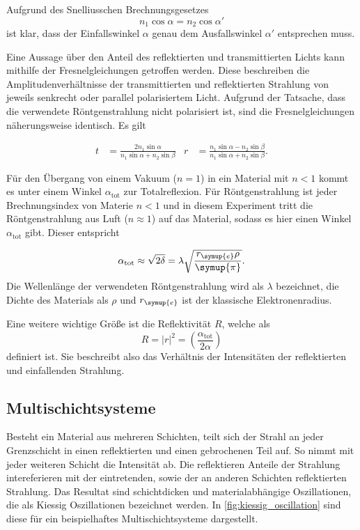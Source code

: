 Aufgrund des Snelliusschen Brechnungsgesetzes
\begin{equation*}
    n_1 \cos \alpha = n_2 \cos \alpha'
\end{equation*}
ist klar, dass der Einfallswinkel $\alpha$ genau dem Ausfallswinkel $\alpha'$ entsprechen muss.

Eine Aussage über den Anteil des reflektierten und transmittierten Lichts kann mithilfe der Fresnelgleichungen getroffen werden. Diese beschreiben die Amplitudenverhältnisse der 
transmittierten und reflektierten Strahlung von jeweils senkrecht oder parallel polarisiertem Licht. Aufgrund der Tatsache, dass die verwendete Röntgenstrahlung nicht polarisiert ist,
sind die Fresnelgleichungen näherungsweise identisch. Es gilt

\begin{align*}
    t &= \frac{2n_1\sin\alpha}{n_1\sin\alpha + n_2 \sin\beta} & r &= \frac{n_1\sin\alpha - n_2\sin\beta}{n_1\sin\alpha+n_2 \sin\beta}.
\end{align*}

Für den Übergang von einem Vakuum ($n=1$) in ein Material mit $n<1$ kommt es unter einem Winkel $\alpha_{\text{tot}}$ zur Totalreflexion. Für Röntgenstrahlung ist jeder Brechnungsindex 
von Materie $n<1$ und in diesem Experiment tritt die Röntgenstrahlung aus Luft ($n \approx 1$) auf das Material, sodass es hier einen Winkel $\alpha_{\text{tot}}$ gibt. Dieser entspricht

\begin{equation}
    \alpha_{\text{tot}} \approx \sqrt{2\delta} = \lambda \sqrt{\frac{r_{\symup{e}}\rho}{\symup{\pi}}}.
    \label{eq:alpha_tot}
\end{equation}
Die Wellenlänge der verwendeten Röntgenstrahlung wird als $\lambda$ bezeichnet, die Dichte des Materials als $\rho$ und $r_{\symup{e}}$ ist der klassische Elektronenradius.

Eine weitere wichtige Größe ist die Reflektivität $R$, welche als
\begin{equation}
    R = |{r}|^2 = \left(\frac{\alpha_{\text{tot}}}{2\alpha}\right)
    \label{eq:Reflektivitaet}
\end{equation}
definiert ist. Sie beschreibt also das Verhältnis der Intensitäten der reflektierten und einfallenden Strahlung.%

\subsection{Multischichtsysteme}
Besteht ein Material aus mehreren Schichten, teilt sich der Strahl an jeder Grenzschicht in einen reflektierten und einen gebrochenen Teil auf. So nimmt mit jeder weiteren Schicht
die Intensität ab. Die reflektieren Anteile der Strahlung intereferieren mit der eintretenden, sowie der an anderen Schichten reflektierten Strahlung. Das Resultat sind schichtdicken
und materialabhängige Oszillationen, die als Kiessig Oszillationen bezeichnet werden. In \autoref{fig:kiessig_oscillation} sind diese für ein beispielhaftes Multischichtsysteme dargestellt.

